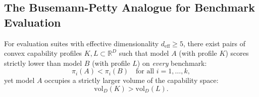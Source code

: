 
\subsection{The Busemann-Petty Analogue for Benchmark Evaluation}

\begin{proposition}
\label{prop:bp}
For evaluation suites with effective dimensionality $d_{\mathrm{eff}} \geq 5$, there exist pairs of convex capability profiles $K, L \subset \mathbb{R}^D$ such that model $A$ (with profile $K$) scores strictly lower than model $B$ (with profile $L$) on \emph{every} benchmark:
\[
  \pi_i(A) < \pi_i(B) \quad \text{for all } i = 1, \ldots, k,
\]
yet model $A$ occupies a strictly larger volume of the capability space:
\[
  \mathrm{vol}_D(K) > \mathrm{vol}_D(L).
\]
\end{proposition}

